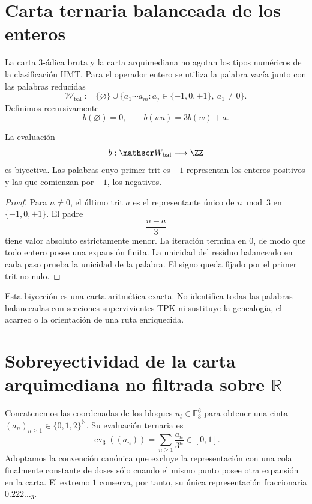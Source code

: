 \section{Carta ternaria balanceada de los enteros}

La carta 3-ádica bruta y la carta arquimediana no agotan los tipos numéricos
de la clasificación HMT. Para el operador entero se utiliza la palabra vacía junto con las
palabras reducidas
\[
 \mathscr W_{\mathrm{bal}}
 :=\{\varnothing\}\cup
 \{a_1\cdots a_m:
 a_j\in\{-1,0,+1\},\ a_1\ne0\}.
\]
Definimos recursivamente
\[
 b(\varnothing)=0,
 \qquad
 b(wa)=3b(w)+a.
\]

\begin{theorem}
\label{pf84:C03}
La evaluación
\[
 b:\mathscr W_{\mathrm{bal}}\longrightarrow\ZZ
\]
es biyectiva. Las palabras cuyo primer trit es \(+1\) representan los
enteros positivos y las que comienzan por \(-1\), los negativos.
\end{theorem}

\begin{proof}
Para \(n\ne0\), el último trit \(a\) es el representante único de
\(n\bmod3\) en \(\{-1,0,+1\}\). El padre
\[
 \frac{n-a}{3}
\]
tiene valor absoluto estrictamente menor. La iteración termina en \(0\), de
modo que todo entero posee una expansión finita. La unicidad del residuo
balanceado en cada paso prueba la unicidad de la palabra. El signo queda
fijado por el primer trit no nulo.
\end{proof}

\begin{remark}
Esta biyección es una carta aritmética exacta. No identifica todas las
palabras balanceadas con secciones supervivientes TPK ni sustituye la
genealogía, el acarreo o la orientación de una ruta enriquecida.
\end{remark}

\section{Sobreyectividad de la carta arquimediana no filtrada sobre \(\mathbb R\)}

Concatenemos las coordenadas de los bloques
\(u_t\in\mathbb F_3^6\) para obtener una cinta
\((a_n)_{n\geq1}\in\{0,1,2\}^{\mathbb N}\). Su evaluación ternaria es
\[
 \operatorname{ev}_3((a_n))=
 \sum_{n\geq1}\frac{a_n}{3^n}\in[0,1].
\]
Adoptamos la convención canónica que excluye la representación con una cola
finalmente constante de doses sólo cuando el mismo punto posee otra expansión
en la carta. El extremo \(1\) conserva, por tanto, su única representación
fraccionaria \(0.222\ldots{}_3\).

